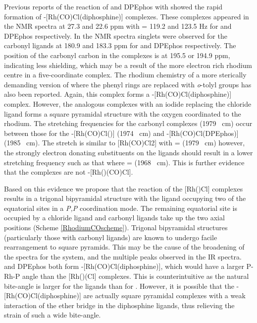 Previous reports of the reaction of \Phxantphos{} and DPEphos with  showed the rapid formation of \trans-{[Rh(CO)Cl(diphosphine)]} complexes.\cite{Deb2010}  These complexes appeared in the \phosphorus{} NMR spectra at 27.3 and 22.6 ppm with \JRhP{} = 119.2 and 123.5 Hz for \Phxantphos{} and DPEphos respectively.  In the \carbon{} NMR spectra singlets were observed for the carbonyl ligands at 180.9 and 183.3 ppm for \Phxantphos{} and DPEphos respectively.  The position of the carbonyl carbon in the \tBuxantphos{} complexes is at 195.5 or 194.9 ppm, indicating less shielding, which may be a result of the more electron rich rhodium centre in a five-coordinate complex.  The rhodium chemistry of a more sterically demanding version of \Phxantphos{} where the phenyl rings are replaced with \emph{o}-tolyl groups has also been reported.\cite{Williams2011}  Again, this complex forms a \trans-[Rh(CO)Cl(diphosphine)] complex.  However, the analogous complexes with an iodide replacing the chloride ligand forms a square pyramidal structure with the oxygen coordinated to the rhodium.  The  stretching frequencies for the \tBuxantphos{} carbonyl complexes (1979 \si{\per\centi\metre}) occur between those for the \trans-[Rh(CO)Cl(\Phxantphos)] (1974 \si{\per\centi\metre}) and \trans-[Rh(CO)Cl(DPEphos)] (1985 \si{\per\cm}).  The  stretch is similar to [Rh(CO)Cl2] with  =  (1979 \si{\per\centi\metre}) however, the strongly electron donating \tBu{} substituents on the \tBuxantphos{} ligands should result in a lower stretching frequency such as that where  =  (1968 \si{\per\cm}).\cite{Banger2009}  This is further evidence that the \tBuxantphos{} complexes are not \trans-[Rh(\tBuxantphos)(CO)Cl].  


Based on this evidence we propose that the reaction of the [Rh(\tBuxantphos)Cl] complexes results in a trigonal bipyramidal structure with the \tBuxantphos{} ligand occupying two of the equatorial sites in a \dento{}\emph{P,P}\textprime{} coordination mode.  The remaining equatorial site is occupied by a chloride ligand and carbonyl ligands take up the two axial positions (Scheme \ref{RhodiumCOscheme}).  Trigonal bipyramidal structures (particularly those with carbonyl ligands) are known to undergo facile rearrangement to square pyramids.\cite{Sanger1985} This may be the cause of the broadening of the spectra for the \tButhixantphos{} system, and the multiple peaks observed in the \gls{IR} spectra.  \Phxantphos{} and DPEphos both form \trans{}-[Rh(CO)Cl(diphosphine)], which would have a larger P-Rh-P angle than the [Rh(\tBuxantphos)(Cl] complexes.  This is counterintuitive as the natural bite-angle is larger for the \tBuxantphos{} ligands than for \Phxantphos{}.  However, it is possible that the \trans{}-[Rh(CO)Cl(diphosphine)] are actually square pyramidal complexes with a weak interaction of the ether bridge in the diphosphine ligands, thus relieving the strain of such a wide bite-angle.

